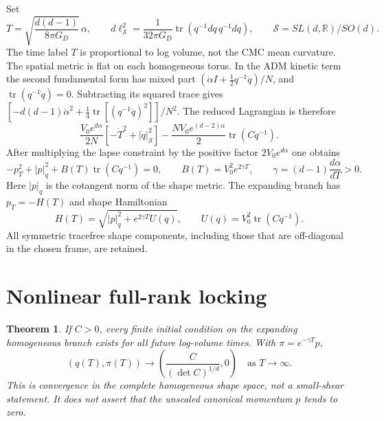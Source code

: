 \documentclass[10pt]{article}
\newtheorem{theorem}{Theorem}
\newcommand{\tr}{\operatorname{tr}}
\begin{document}
Set
\[
 T=\sqrt{\frac{d(d-1)}{8\pi G_D}}\,\alpha,\qquad
 d\ell_{\mathcal S}^2=\frac{1}{32\pi G_D}
      \tr(q^{-1}dq\,q^{-1}dq),\qquad
 \mathcal S=SL(d,\mathbb R)/SO(d).
\]
The time label $T$ is proportional to log volume, not the CMC mean curvature. The spatial metric is flat on each homogeneous torus. In the ADM kinetic term the second fundamental form has mixed part $(\dot\alpha I+\tfrac12 q^{-1}\dot q)/N$, and $\tr(q^{-1}\dot q)=0$. Subtracting its squared trace gives $[-d(d-1)\dot\alpha^2+\tfrac14\tr[(q^{-1}\dot q)^2]]/N^2$. The reduced Lagrangian is therefore
\[
 \frac{V_0e^{d\alpha}}{2N}[-\dot T^2+|\dot q|_{\mathcal S}^2]
 -\frac{NV_0e^{(d-2)\alpha}}{2}\tr(Cq^{-1}).
\]
After multiplying the lapse constraint by the positive factor $2V_0e^{d\alpha}$ one obtains
\begin{equation}
 -p_T^2+|p|_q^2+B(T)\tr(Cq^{-1})=0,\qquad
 B(T)=V_0^2 e^{2\gamma T},\qquad
 \gamma=(d-1)\frac{d\alpha}{dT}>0 .
 \label{eq:constraint}
\end{equation}
Here $|p|_q$ is the cotangent norm of the shape metric. The expanding branch has $p_T=-H(T)$ and shape Hamiltonian
\[
 H(T)=\sqrt{|p|_q^2+e^{2\gamma T}U(q)},\qquad
 U(q)=V_0^2\tr(Cq^{-1}).
\]
All symmetric tracefree shape components, including those that are off-diagonal in the chosen frame, are retained.

\section{Nonlinear full-rank locking}

\begin{theorem}
If $C>0$, every finite initial condition on the expanding homogeneous branch exists for all future log-volume times. With $\pi=e^{-\gamma T}p$,
\[
 (q(T),\pi(T))\longrightarrow
 \left(\frac{C}{(\det C)^{1/d}},0\right)
 \quad\text{as }T\to\infty .
\]
This is convergence in the complete homogeneous shape space, not a small-shear statement. It does not assert that the unscaled canonical momentum $p$ tends to zero.
\end{theorem}
\end{document}
